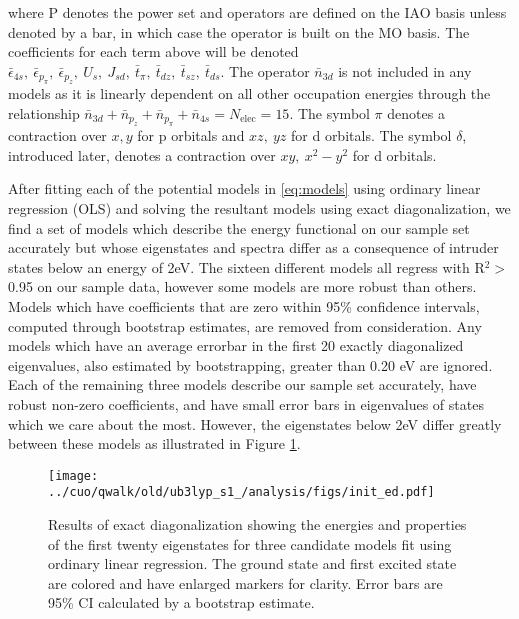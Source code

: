 \documentclass[12pt]{article}
\begin{document}
where P denotes the power set and operators are defined on the IAO basis unless denoted by a bar, in which case the operator is built on the MO basis. The coefficients for each term above will be denoted $\bar{\epsilon}_{4s},\ \bar{\epsilon}_{p_\pi},\ \bar{\epsilon}_{p_z},\ U_s,\ J_{sd},\ \bar{t}_\pi,\ \bar{t}_{dz},\ \bar{t}_{sz},\ \bar{t}_{ds}$. The operator $\bar{n}_{3d}$ is not included in any models as it is linearly dependent on all other occupation energies through the relationship $\bar{n}_{3d} + \bar{n}_{p_z} + \bar{n}_{p_\pi} + \bar{n}_{4s} = N_\text{elec} = \text{15}$. The symbol $\pi$ denotes a contraction over $x, y$ for p orbitals and $xz,\ yz$ for d orbitals. The symbol $\delta$, introduced later, denotes a contraction over $xy,\ x^2-y^2$ for d orbitals.

After fitting each of the potential models in \eqref{eq:models} using ordinary linear regression (OLS) and solving the resultant models using exact diagonalization, we find a set of models which describe the energy functional on our sample set accurately but whose eigenstates and spectra differ as a consequence of intruder states below an energy of 2eV. 
The sixteen different models all regress with R$^2 >$ 0.95 on our sample data, however some models are more robust than others. 
Models which have coefficients that are zero within 95\% confidence intervals, computed through bootstrap estimates, are removed from consideration.
Any models which have an average errorbar in the first 20 exactly diagonalized eigenvalues, also estimated by bootstrapping, greater than 0.20 eV are ignored.
Each of the remaining three models describe our sample set accurately, have robust non-zero coefficients, and have small error bars in eigenvalues of states which we care about the most.
However, the eigenstates below 2eV differ greatly between these models as illustrated in Figure \ref{fig:InitED}.

\begin{figure}[H]
\begin{center}
\texttt{[image: ../cuo/qwalk/old/ub3lyp\_s1\_/analysis/figs/init\_ed.pdf]}
\end{center}
\caption{Results of exact diagonalization showing the energies and properties of the first twenty eigenstates for three candidate models fit using ordinary linear regression. The ground state and first excited state are colored and have enlarged markers for clarity. Error bars are 95\% CI calculated by a bootstrap estimate.}
\label{fig:InitED}
\end{figure}
\end{document}
